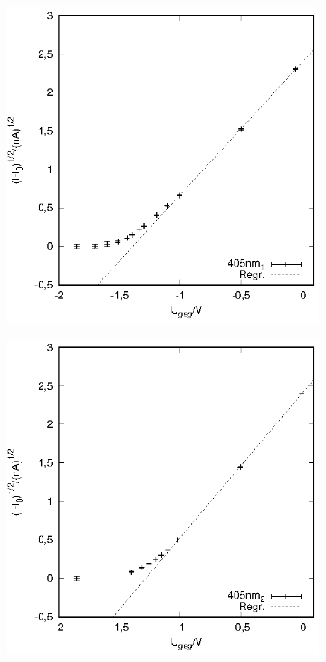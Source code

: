 \begin{figure}[h!]
\begin{subfigure}[h]{0.5\textwidth}
  \end{subfigure}
    \begin{subfigure}[h]{0.5\textwidth}
    \centering
    \includegraphics{data/Messung_photoeffekt/405nm_1.eps}
  \end{subfigure}%
  \begin{subfigure}[h]{0.5\textwidth}
    \centering
    \includegraphics{data/Messung_photoeffekt/405nm_2.eps}
  \end{subfigure}
\end{figure}

